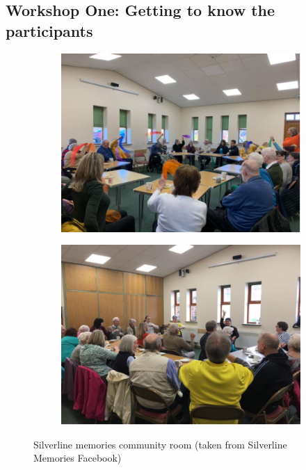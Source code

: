 \subsection{Workshop One: Getting to know the participants}
\label{StudyOne:W1}
\begin{figure}[htp]
\centering
\begin{subfigure}{.5\textwidth}
  \centering
  \includegraphics[width=.8\linewidth]{Images/ChapterFour/SilverlineCommunityRoomOne.png}
  \label{fig:communityRoomOne}
\end{subfigure}%
\begin{subfigure}{.5\textwidth}
  \centering
  \includegraphics[width=.8\linewidth]{Images/ChapterFour/SilverlineMemoriesCommunityRoomTwo.png}
  \label{fig:communityRoomTwo}
\end{subfigure}
\caption{Silverline memories community room (taken from Silverline Memories Facebook)}
\label{fig:SilverlineCommunityRoom}
\end{figure}

